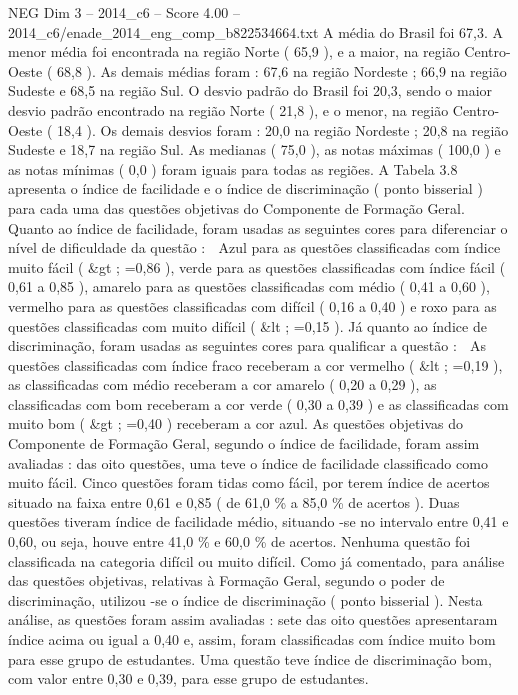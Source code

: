 \begin{textsample}{NEG Dim 3 – 2014\_c6 – Score 4.00 – 2014\_c6/enade\_2014\_eng\_comp\_b822534664.txt}
A média do Brasil foi 67,3.
A menor média foi encontrada na região Norte ( 65,9 ), e a maior, na região Centro-Oeste ( 68,8 ).
As demais médias foram : 67,6 na região Nordeste ; 66,9 na região Sudeste e 68,5 na região Sul.
O desvio padrão do Brasil foi 20,3, sendo o maior desvio padrão encontrado na região Norte ( 21,8 ), e o menor, na região Centro-Oeste ( 18,4 ).
Os demais desvios foram : 20,0 na região Nordeste ; 20,8 na região Sudeste e 18,7 na região Sul.
As medianas ( 75,0 ), as notas máximas ( 100,0 ) e as notas mínimas ( 0,0 ) foram iguais para todas as regiões.
A Tabela 3.8 apresenta o índice de facilidade e o índice de discriminação ( ponto bisserial ) para cada uma das questões objetivas do Componente de Formação Geral.
Quanto ao índice de facilidade, foram usadas as seguintes cores para diferenciar o nível de dificuldade da questão :  Azul para as questões classificadas com índice muito fácil ( \&gt ; =0,86 ), verde para as questões classificadas com índice fácil ( 0,61 a 0,85 ), amarelo para as questões classificadas com médio ( 0,41 a 0,60 ), vermelho para as questões classificadas com difícil ( 0,16 a 0,40 ) e roxo para as questões classificadas com muito difícil ( \&lt ; =0,15 ).
Já quanto ao índice de discriminação, foram usadas as seguintes cores para qualificar a questão :  As questões classificadas com índice fraco receberam a cor vermelho ( \&lt ; =0,19 ), as classificadas com médio receberam a cor amarelo ( 0,20 a 0,29 ), as classificadas com bom receberam a cor verde ( 0,30 a 0,39 ) e as classificadas com muito bom ( \&gt ; =0,40 ) receberam a cor azul.
As questões objetivas do Componente de Formação Geral, segundo o índice de facilidade, foram assim avaliadas : das oito questões, uma teve o índice de facilidade classificado como muito fácil.
Cinco questões foram tidas como fácil, por terem índice de acertos situado na faixa entre 0,61 e 0,85 ( de 61,0 \% a 85,0 \% de acertos ).
Duas questões tiveram índice de facilidade médio, situando -se no intervalo entre 0,41 e 0,60, ou seja, houve entre 41,0 \% e 60,0 \% de acertos.
Nenhuma questão foi classificada na categoria difícil ou muito difícil.
Como já comentado, para análise das questões objetivas, relativas à Formação Geral, segundo o poder de discriminação, utilizou -se o índice de discriminação ( ponto bisserial ).
Nesta análise, as questões foram assim avaliadas : sete das oito questões apresentaram índice acima ou igual a 0,40 e, assim, foram classificadas com índice muito bom para esse grupo de estudantes.
Uma questão teve índice de discriminação bom, com valor entre 0,30 e 0,39, para esse grupo de estudantes.

\end{textsample}
